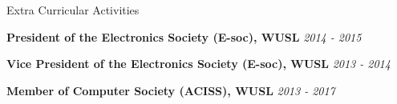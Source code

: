 \documentclass[
	11pt, %
]{./assets/resume} %
\begin{document}




\begin{rSection}{Extra Curricular Activities}

	\textbf{President of the Electronics Society (E-soc), WUSL} \hfill \textit{2014 - 2015}

	\textbf{Vice President of the Electronics Society (E-soc), WUSL} \hfill \textit{2013 - 2014}

	\textbf{Member of Computer Society (ACISS), WUSL} \hfill \textit{2013 - 2017}

\end{rSection}
















\end{document}
